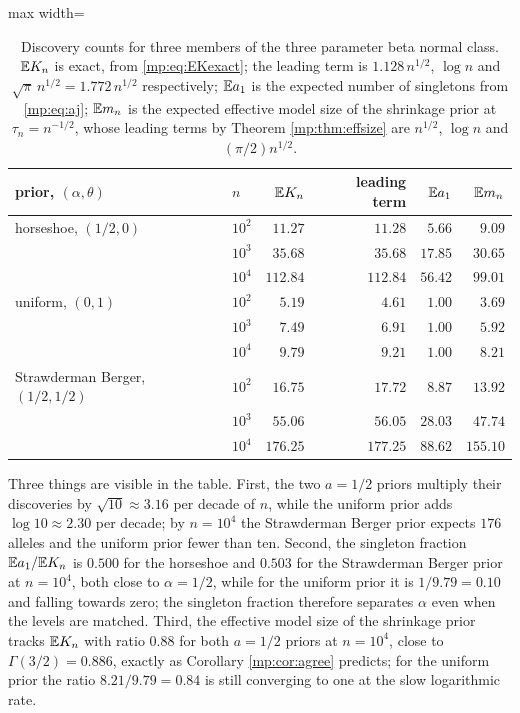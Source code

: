 \begin{example}
\begin{table}[t]
\centering
\begin{adjustbox}{max width=\textwidth}
\begin{tabular}{llrrrr}
\toprule
prior, $(\alpha,\theta)$ & $n$ & $\mathbb{E} K_n$ & leading term & $\mathbb{E} a_1$ & $\mathbb{E} m_n$ \\
\midrule
horseshoe, $(1/2,0)$ & $10^2$ & $11.27$ & $11.28$ & $5.66$ & $9.09$ \\
 & $10^3$ & $35.68$ & $35.68$ & $17.85$ & $30.65$ \\
 & $10^4$ & $112.84$ & $112.84$ & $56.42$ & $99.01$ \\
\midrule
uniform, $(0,1)$ & $10^2$ & $5.19$ & $4.61$ & $1.00$ & $3.69$ \\
 & $10^3$ & $7.49$ & $6.91$ & $1.00$ & $5.92$ \\
 & $10^4$ & $9.79$ & $9.21$ & $1.00$ & $8.21$ \\
\midrule
Strawderman Berger, $(1/2,1/2)$ & $10^2$ & $16.75$ & $17.72$ & $8.87$ & $13.92$ \\
 & $10^3$ & $55.06$ & $56.05$ & $28.03$ & $47.74$ \\
 & $10^4$ & $176.25$ & $177.25$ & $88.62$ & $155.10$ \\
\bottomrule
\end{tabular}
\end{adjustbox}
\caption{Discovery counts for three members of the three parameter beta normal class.
$\mathbb{E} K_n$ is exact, from \eqref{mp:eq:EKexact}; the leading term is $1.128\,n^{1/2}$,
$\log n$ and $\sqrt\pi\,n^{1/2}=1.772\,n^{1/2}$ respectively; $\mathbb{E} a_1$ is the expected number
of singletons from \eqref{mp:eq:aj}; $\mathbb{E} m_n$ is the expected effective model size of the
shrinkage prior at $\tau_n=n^{-1/2}$, whose leading terms by Theorem \ref{mp:thm:effsize} are
$n^{1/2}$, $\log n$ and $(\pi/2)n^{1/2}$.}
\label{mp:tab:tpb}
\end{table}

Three things are visible in the table. First, the two $a=1/2$ priors multiply their
discoveries by $\sqrt{10}\approx3.16$ per decade of $n$, while the uniform prior adds
$\log10\approx2.30$ per decade; by $n=10^4$ the Strawderman Berger prior expects $176$ alleles
and the uniform prior fewer than ten. Second, the singleton fraction $\mathbb{E} a_1/\mathbb{E} K_n$ is
$0.500$ for the horseshoe and $0.503$ for the Strawderman Berger prior at $n=10^4$, both close
to $\alpha=1/2$, while for the uniform prior it is $1/9.79=0.10$ and falling towards zero; the
singleton fraction therefore separates $\alpha$ even when the levels are matched. Third, the
effective model size of the shrinkage prior tracks $\mathbb{E} K_n$ with ratio $0.88$ for both
$a=1/2$ priors at $n=10^4$, close to $\Gamma(3/2)=0.886$, exactly as Corollary
\ref{mp:cor:agree} predicts; for the uniform prior the ratio $8.21/9.79=0.84$ is still
converging to one at the slow logarithmic rate.
\end{example}


